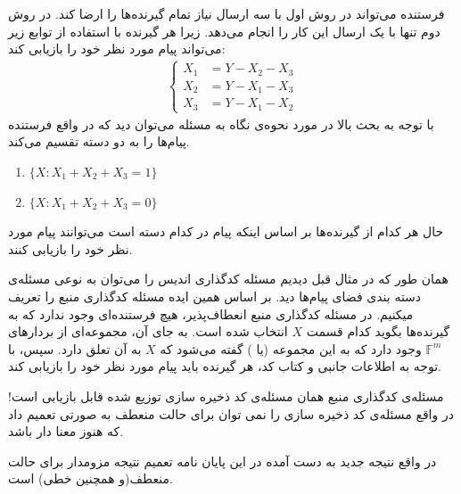 \begin{example}
\begin{minipage}{0.5\textwidth}
	\end{minipage}
	\newline
		فرستنده می‌تواند در روش اول با سه ارسال نیاز تمام گیرنده‌ها را ارضا کند. در روش دوم تنها با یک ارسال این کار را انجام می‌دهد. زیرا هر گیرنده با استفاده از توابع زیر می‌تواند پیام مورد نظر خود را بازیابی کند:
	\begin{align*}
		\begin{cases}
				X_1 &= Y - X_2 - X_3 \\
				X_2 &= Y - X_1 - X_3  \\
				X_3 &= Y - X_1 - X_2  
			\end{cases}   
	\end{align*}
	با توجه به بحث بالا در مورد نحوه‌ی نگاه به مسئله می‌توان دید که در واقع فرستنده پیام‌ها را به دو دسته تقسیم می‌کند.
	\begin{latin}

		\begin{enumerate}
			\centering
			\item $\{X: X_1 + X_2 + X_3 = 1\}$
			\item $\{X: X_1 + X_2 + X_3 = 0\}$
		\end{enumerate}
	\end{latin}
	حال هر کدام از گیرنده‌ها بر اساس اینکه پیام در کدام دسته است می‌توانند پیام مورد نظر خود را بازیابی کنند.
\end{example}

همان طور که در مثال قبل دیدیم مسئله کدگذاری اندیس را می‌توان به نوعی مسئله‌ی دسته بندی فضای پیام‌ها دید. بر اساس همین ایده مسئله کدگذاری منبع را تعریف میکنیم. در مسئله کدگذاری منبع انعطاف‌پذیر، هیچ فرستنده‌ای وجود ندارد که به گیرنده‌ها بگوید کدام قسمت $X$ انتخاب شده است. به جای آن، مجموعه‌ای از بردارهای $\mathbb{F}^m$ وجود دارد که به این مجموعه
 (یا 
 ) گفته می‌شود که $X$ به آن تعلق دارد. سپس، با توجه به اطلاعات جانبی و کتاب کد، هر گیرنده باید پیام مورد نظر خود را بازیابی کند.
\begin{مشاهده}
	مسئله‌ی کدگذاری منبع همان مسئله‌ی کد ذخیره سازی توزیع شده قابل بازیابی است! در واقع مسئله‌ی کد ذخیره سازی را نمی توان برای حالت منعطف به صورتی تعمیم داد که هنوز معنا دار باشد.
	
	در واقع نتیجه جدید به دست آمده در این پایان نامه تعمیم نتیجه مزومدار برای حالت منعطف(و همچنین خطی) است.
\end{مشاهده}

